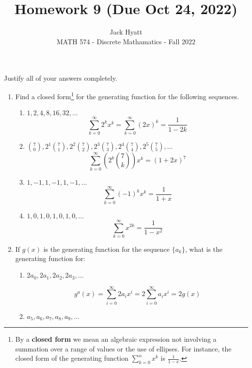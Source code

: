 \documentclass[12pt]{article}
\begin{document}
	
	
	
	\title{Homework 9 (Due Oct 24, 2022)}
	\author{Jack Hyatt\\ %
		MATH 574 - Discrete Mathamatics - Fall 2022} 
	
	\maketitle
	
	Justify all of your answers completely.\\
	
	\renewcommand{\qedsymbol}{$\blacksquare$}


\begin{enumerate}


\item Find a closed form\footnote{By a {\bf closed form} we mean an algebraic expression
not involving a summation over a range of values or
the use of ellipses. For instance, the closed form of the generating function $\sum_{k=0}^nx^k$ is $\frac{1}{1-x}$.} for the generating function for the following sequences.
\begin{enumerate}
\item $1,2,4,8,16,32, \ldots$
\[\sum_{k=0}^{\infty} 2^kx^k= \sum_{k=0}^{\infty} (2x)^k = \frac{1}{1-2k}\]
\item ${7 \choose 0}, 2^1{7 \choose 1}, 2^2{7 \choose 2}, 2^3{7 \choose 3}, 2^4{7 \choose 4}, 2^5{7 \choose 5}, \ldots$
\[\sum_{k=0}^{\infty} (2^k\binom{7}{k})x^k = (1+2x)^7\]
\item $1, -1, 1, -1, 1, -1, \ldots$
\[\sum_{k=0}^{\infty} (-1)^kx^k = \frac{1}{1+x}\]
\item $1,0,1,0,1,0,1,0,\ldots$
\[\sum_{k=0}^{\infty} x^{2k} = \frac{1}{1-x^2}\]
\end{enumerate}

\medskip

\item If $g(x)$ is the generating function for the sequence $\{a_k\}$, what is the generating function for:
\begin{enumerate}
\item $2a_0, 2a_1, 2a_2, 2a_3, \ldots$

\[g^a(x)=\sum_{i=0}^{\infty}2a_ix^i = 2\sum_{i=0}^{\infty}a_ix^i = 2g(x)\]

\item $a_5, a_6, a_7, a_8, a_9, \ldots$



\end{enumerate}
\end{enumerate}
\end{document}
